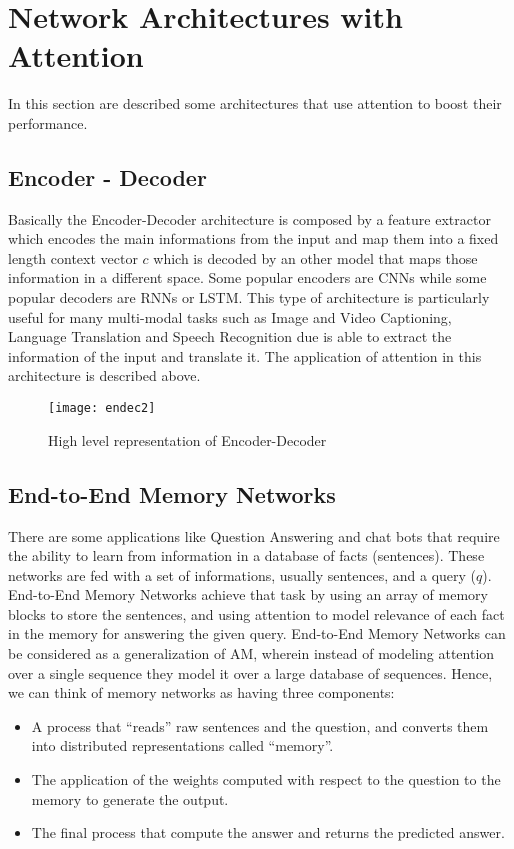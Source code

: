 \documentclass[11pt]{article}
\begin{document}
\section{Network Architectures with Attention}
In this section are described some architectures that use attention to boost their performance.

\subsection{Encoder - Decoder}
Basically the Encoder-Decoder architecture is composed by a feature extractor which encodes the main informations from the input and map them into a fixed length context vector $c$ which is decoded by an other model that maps those information in a different space. Some popular encoders are CNNs while some popular decoders are RNNs or LSTM. This type of architecture is particularly useful for many multi-modal tasks such as Image and Video Captioning, Language Translation and Speech Recognition due is able to extract the information of the input and translate it. The application of attention in this architecture is described above.

\begin{figure}[h]
\centerline{\texttt{[image: endec2]}}
\caption{High level representation of Encoder-Decoder}
\label{fig}
\end{figure}


\subsection{End-to-End Memory Networks}
There are some applications like Question Answering and chat bots that require the ability to learn from information in a database of facts (sentences). These networks are fed with a set of informations, usually sentences, and a query ($q$). End-to-End Memory Networks \cite{Sukhbaatar} achieve that task by using an array of memory blocks to store the sentences, and using attention to model relevance of each fact in the memory for answering the given query. End-to-End Memory Networks can be considered as a generalization of AM, wherein instead of modeling attention over a single sequence they model it over a large database of sequences. Hence, we can think of memory networks as having three components: 
\begin{itemize}
\item A process that “reads” raw sentences and the question, and converts them into distributed representations called ``memory''.
\item The application of the weights computed with respect to the question to the memory to generate the output.
\item The final process that compute the answer and returns the predicted answer.
\end{itemize}
\end{document}
